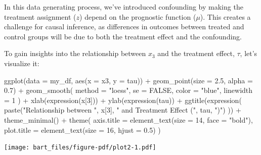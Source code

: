 \documentclass[
  letterpaper,
  DIV=11,
  numbers=noendperiod]{scrreprt}
\newenvironment{Shaded}{\begin{snugshade}}{\end{snugshade}}
\newcommand{\AttributeTok}[1]{\textcolor[rgb]{0.40,0.45,0.13}{#1}}
\newcommand{\ConstantTok}[1]{\textcolor[rgb]{0.56,0.35,0.01}{#1}}
\newcommand{\DecValTok}[1]{\textcolor[rgb]{0.68,0.00,0.00}{#1}}
\newcommand{\FloatTok}[1]{\textcolor[rgb]{0.68,0.00,0.00}{#1}}
\newcommand{\FunctionTok}[1]{\textcolor[rgb]{0.28,0.35,0.67}{#1}}
\newcommand{\NormalTok}[1]{\textcolor[rgb]{0.00,0.23,0.31}{#1}}
\newcommand{\SpecialCharTok}[1]{\textcolor[rgb]{0.37,0.37,0.37}{#1}}
\newcommand{\StringTok}[1]{\textcolor[rgb]{0.13,0.47,0.30}{#1}}
\begin{document}
In this data generating process, we've introduced confounding by making
the treatment assignment (\(z\)) depend on the prognostic function
(\(\mu\)). This creates a challenge for causal inference, as differences
in outcomes between treated and control groups will be due to both the
treatment effect and the confounding.

To gain insights into the relationship between \(x_3\) and the treatment
effect, \(\tau\), let's visualize it:

\begin{Shaded}
\begin{Highlighting}[]
\FunctionTok{ggplot}\NormalTok{(}\AttributeTok{data =}\NormalTok{ my\_df, }\FunctionTok{aes}\NormalTok{(}\AttributeTok{x =}\NormalTok{ x3, }\AttributeTok{y =}\NormalTok{ tau)) }\SpecialCharTok{+}
  \FunctionTok{geom\_point}\NormalTok{(}\AttributeTok{size =} \FloatTok{2.5}\NormalTok{, }\AttributeTok{alpha =} \FloatTok{0.7}\NormalTok{) }\SpecialCharTok{+}
  \FunctionTok{geom\_smooth}\NormalTok{(}
    \AttributeTok{method =} \StringTok{"loess"}\NormalTok{,}
    \AttributeTok{se =} \ConstantTok{FALSE}\NormalTok{,}
    \AttributeTok{color =} \StringTok{"blue"}\NormalTok{,}
    \AttributeTok{linewidth =} \DecValTok{1}
\NormalTok{  ) }\SpecialCharTok{+}
  \FunctionTok{xlab}\NormalTok{(}\FunctionTok{expression}\NormalTok{(x[}\DecValTok{3}\NormalTok{])) }\SpecialCharTok{+}
  \FunctionTok{ylab}\NormalTok{(}\FunctionTok{expression}\NormalTok{(tau)) }\SpecialCharTok{+}
  \FunctionTok{ggtitle}\NormalTok{(}\FunctionTok{expression}\NormalTok{(}
    \FunctionTok{paste}\NormalTok{(}\StringTok{"Relationship between "}\NormalTok{, x[}\DecValTok{3}\NormalTok{], }\StringTok{" and Treatment Effect ("}\NormalTok{, tau, }\StringTok{")"}\NormalTok{)}
\NormalTok{  )) }\SpecialCharTok{+}
  \FunctionTok{theme\_minimal}\NormalTok{() }\SpecialCharTok{+}
  \FunctionTok{theme}\NormalTok{(}
    \AttributeTok{axis.title =} \FunctionTok{element\_text}\NormalTok{(}\AttributeTok{size =} \DecValTok{14}\NormalTok{, }\AttributeTok{face =} \StringTok{"bold"}\NormalTok{),}
    \AttributeTok{plot.title =} \FunctionTok{element\_text}\NormalTok{(}\AttributeTok{size =} \DecValTok{16}\NormalTok{, }\AttributeTok{hjust =} \FloatTok{0.5}\NormalTok{)}
\NormalTok{  )}
\end{Highlighting}
\end{Shaded}

\texttt{[image: bart\_files/figure-pdf/plot2-1.pdf]}
\end{document}

